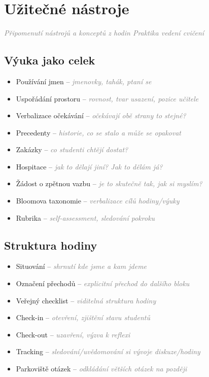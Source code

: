 \documentclass[twoside,openany]{book}
\newcommand{\note}[1]{\textcolor{gray}{\small\itshape #1}}
\begin{document}
\chapter*{Užitečné nástroje}
\vspace{-0.5em}
\note{Připomenutí nástrojů a konceptů z hodin Praktika vedení cvičení}

\section*{Výuka jako celek}

\begin{itemize}
\item Používání jmen -- \note{jmenovky, tahák, ptaní se}
\item Uspořádání prostoru -- \note{rovnost, tvar usazení, pozice učitele}
\item Verbalizace očekávání -- \note{očekávají obě strany to stejné?}
\item Precedenty -- \note{historie, co se stalo a může se opakovat}
\item Zakázky -- \note{co studenti chtějí dostat?}
\item Hospitace -- \note{jak to dělají jiní? Jak to dělám já?}
\item Žádost o zpětnou vazbu -- \note{je to skutečně tak, jak si myslím?}
\item Bloomova taxonomie -- \note{verbalizace cílů hodiny/výuky}
\item Rubrika -- \note{self-assessment, sledování pokroku}
\end{itemize}

\section*{Struktura hodiny}

\begin{itemize}
\item Situování -- \note{shrnutí kde jsme a kam jdeme}
\item Označení přechodů -- \note{explicitní přechod do dalšího bloku}
\item Veřejný checklist -- \note{viditelná struktura hodiny}
\item Check-in -- \note{otevření, zjištění stavu studentů}
\item Check-out -- \note{uzavření, výzva k reflexi}
\item Tracking -- \note{sledování/uvědomování si vývoje diskuze/hodiny}
\item Parkoviště otázek -- \note{odkládání větších otázek na později}
\end{itemize}
\end{document}
